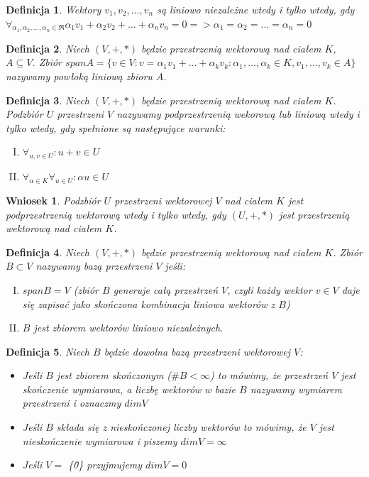 \documentclass[12pt,a4paper]{article}
\newtheorem{df}{Definicja}[section]
\newtheorem{wn}{Wniosek}[section]
\begin{document}
\begin{df}
Wektory $v_{1}, v_{2}, \dots, v_{n}$ s\k{a} liniowo niezale\.{z}ne wtedy i tylko wtedy, gdy $\forall_{\alpha_{1}, \alpha_{2}, \dots, \alpha_{n} \in \Re} \alpha_{1}v_{1} + \alpha_{2}v_{2} + \dots + \alpha_{n}v_{n} = 0 => \alpha_{1} = \alpha_{2} = \dots = \alpha_{n} = 0$
\end{df}
\begin{df}
Niech $(V, +, *)$ b\k{e}dzie przestrzeni\k{a} wektorow\k{a} nad cia{\l}em $K$, $A\subseteq V$. Zbi\'or $spanA=\{v\in V: v=\alpha_{1}v_{1}+\ldots+\alpha_{k}v_{k}: \alpha_{1},\ldots,\alpha_{k}\in K, v_{1},\ldots,v_{k}\in A\}$ nazywamy pow{\l}ok\k{a} liniow\k{a} zbioru $A$.
\end{df}
\begin{df}
Niech $(V, +, *)$ b\k{e}dzie przestrzeni\k{a} wektorow\k{a} nad cia{\l}em $K$. Podzbi\'or $U$ przestrzeni $V$ nazywamy podprzestrzeni\k{a} wekorow\k{a} lub liniow\k{a} wtedy i tylko wtedy, gdy spe{\l}nione s\k{a} nast\k{e}puj\k{a}ce warunki:
\begin{enumerate}[I.]
\item $\forall_{u,v\in U}: u+v\in U$ 
\item $\forall_{\alpha\in K}\forall_{u\in U}: \alpha u\in U$
\end{enumerate}
\end{df}
\begin{wn}
Podzbi\'or $U$ przestrzeni wektorowej $V$ nad cia{\l}em $K$ jest podprzestrzeni\k{a} wektorow\k{a} wtedy i tylko wtedy, gdy $(U, +, *)$ jest przestrzeni\k{a} wektorow\k{a} nad cia{\l}em $K$.
\end{wn}
\begin{df}
Niech $(V, +, *)$ b\k{e}dzie przestrzeni\k{a} wektorow\k{a} nad cia{\l}em $K$. Zbi\'{o}r $B \subset V$ nazywamy baz\k{a} przestrzeni $V$ je\'{s}li:
\begin{enumerate}[I.]
\item $span B = V$ (zbi\'{o}r $B$ generuje ca{\l}\k{a} przestrze\'{n} $V$, czyli ka\.{z}dy wektor $v \in V$ daje si\k{e} zapisa\'{c} jako sko\'{n}czona kombinacja liniowa wektor\'{o}w z $B$)
\item $B$ jest zbiorem wektor\'{o}w liniowo niezale\.{z}nych.
\end{enumerate}
\end{df}
\begin{df}
Niech $B$ b\k{e}dzie dowolna baz\k{a} przestrzeni wektorowej $V$:
\begin{itemize}
\item Je\'{s}li $B$ jest zbiorem sko\'{n}czonym ($\#B<\infty$) to m\'{o}wimy, \.{z}e przestrze\'{n} $V$ jest sko\'{n}czenie wymiarowa, a liczb\k{e} wektor\'{o}w w bazie $B$ nazywamy wymiarem przestrzeni i oznaczmy $dim V$
\item Je\'{s}li $B$ sk{\l}ada si\k{e} z niesko\'{n}czonej liczby wektor\'{o}w to m\'{o}wimy, \.{z}e $V$ jest niesko\'{n}czenie wymiarowa i piszemy $dim V = \infty$
\item Je\'{s}li $V =$ \{\={0}\} przyjmujemy $dim V = 0$
\end{itemize}
\end{df}
\end{document}
